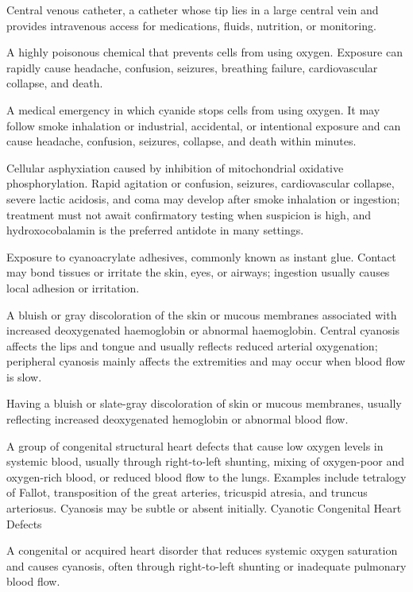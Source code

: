  Central venous catheter, a catheter whose tip lies in a large central vein and provides intravenous access for medications, fluids, nutrition, or monitoring.

 A highly poisonous chemical that prevents cells from using oxygen. Exposure can rapidly cause headache, confusion, seizures, breathing failure, cardiovascular collapse, and death.

 A medical emergency in which cyanide stops cells from using oxygen. It may follow smoke inhalation or industrial, accidental, or intentional exposure and can cause headache, confusion, seizures, collapse, and death within minutes.

 Cellular asphyxiation caused by inhibition of mitochondrial oxidative phosphorylation. Rapid agitation or confusion, seizures, cardiovascular collapse, severe lactic acidosis, and coma may develop after smoke inhalation or ingestion; treatment must not await confirmatory testing when suspicion is high, and hydroxocobalamin is the preferred antidote in many settings.

 Exposure to cyanoacrylate adhesives, commonly known as instant glue. Contact may bond tissues or irritate the skin, eyes, or airways; ingestion usually causes local adhesion or irritation.

 A bluish or gray discoloration of the skin or mucous membranes associated with increased deoxygenated haemoglobin or abnormal haemoglobin.
Central cyanosis affects the lips and tongue and usually reflects reduced arterial oxygenation; peripheral cyanosis mainly affects the extremities and may occur when blood flow is slow.

 Having a bluish or slate-gray discoloration of skin or mucous membranes, usually reflecting increased deoxygenated hemoglobin or abnormal blood flow.

 A group of congenital structural heart defects that cause low oxygen levels in systemic blood,
usually through right-to-left shunting, mixing of oxygen-poor and oxygen-rich blood, or reduced
blood flow to the lungs. Examples include tetralogy of Fallot, transposition of the great
arteries, tricuspid atresia, and truncus arteriosus. Cyanosis may be subtle or absent initially.
\synonyms
Cyanotic Congenital Heart Defects

 A congenital or acquired heart disorder that reduces systemic oxygen saturation and causes cyanosis, often through right-to-left shunting or inadequate pulmonary blood flow.

